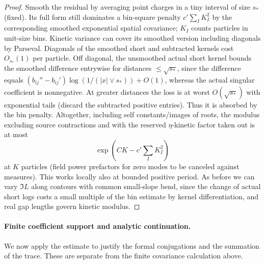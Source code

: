 \documentclass[11pt]{article}
\numberwithin{equation}{section}
\theoremstyle{definition}\newtheorem{definition}[theorem]{Definition}
\theoremstyle{remark}\newtheorem{remark}[theorem]{Remark}
\begin{document}
\begin{proof}
Smooth the residual by averaging point charges in a tiny interval of size \(s_*\) (fixed). Its full form still dominates a bin-square penalty \(c'\sum_I K_I^2\) by the corresponding smoothed exponential spatial covariance; \(K_I\) counts particles in unit-size bins. Kinetic variance can cover its smoothed version including diagonals by Parseval. Diagonals of the smoothed short and subtracted kernels cost \(O_{s_*}(1)\) per particle. Off diagonal, the unsmoothed actual short kernel bounds the smoothed difference entrywise for distances \(\le\sqrt{s_*}\), since the difference equals \((b_{ij}''-b_{ij}')\log(1/(|x|\vee s_*))+O(1)\), whereas the actual singular coefficient is nonnegative. At greater distances the loss is at worst \(O(\sqrt{s_*})\) with exponential tails (discard the subtracted positive entries). Thus it is absorbed by the bin penalty. Altogether, including self constants/images of roots, the modulus excluding source contractions and with the reserved \(\eta\)-kinetic factor taken out is at most
\[
 \exp(CK-c'\sum_I K_I^2)
\]
at \(K\) particles (field power prefactors for zero modes to be canceled against measures). This works locally also at bounded positive period. As before we can vary \(\Im L\) along contours with common small-slope bend, since the change of actual short logs costs a small multiple of the bin estimate by kernel differentiation, and real gap lengths govern kinetic modulus.

\end{proof}

\paragraph{Finite coefficient support and analytic continuation.}
We now apply the estimate to justify the formal conjugations and the
summation of the trace. These are separate from the finite covariance
calculation above.
\end{document}
